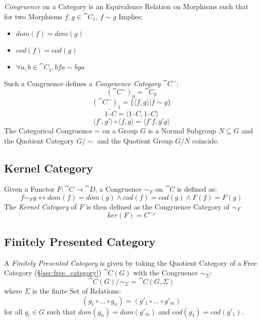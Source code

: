 \emph{Congruence} on a Category is an Equivalence Relation on
Morphisms such that for two Morphisms $f,g \in \cat{C_1}$, $f \sim
g$ Implies:
\begin{itemize}
  \item $dom(f) = dom(g)$
  \item $cod(f) = cod(g)$
  \item $\forall a,b \in \cat{C_1}, bfa \sim bga$
\end{itemize}
Such a Congruence defines a \emph{Congruence Category}
$\cat{C^{\sim}}$:
\[
  (\cat{C^{\sim}})_0 = \cat{C}_0
\]\[
  (\cat{C^{\sim}})_1 = \{\langle f,g \rangle | f \sim g\}
\]\[
  \tilde{1_\cat{C}} = \langle 1_\cat{C}, 1_\cat{C} \rangle
\]\[
  \langle f',g' \rangle \circ \langle f,g \rangle = \langle f'f,g'g \rangle
\]
The Categorical Congruence $\sim$ on a Group $G$ is a Normal Subgroup
$N \subseteq G$ and the Quotient Category $G/\sim$ and the Quotient
Group $G/N$ coincide. \cite{awodey06}



\subsection{Kernel Category}\label{sec:kernel_category}

Given a Functor $F : \cat{C} \rightarrow \cat{D}$, a Congruence
$\sim_F$ on $\cat{C}$ is defined as:
\[
  f \sim_F g \leftrightarrow dom(f) = dom(g) \wedge cod(f) = cod(g)
  \wedge F(f) = F(g)
\]
The \emph{Kernel Category} of $F$ is then defined as the Congruence
Category of $\sim_F$
\[
  ker(F) = C^{\sim_F}
\]



\subsection{Finitely Presented Category}
\label{sec:finitely_presented}

A \emph{Finitely Presented Category} is given by taking the Quotient
Category of a Free Category (\S\ref{sec:free_category})
$\cat{C}(G)$ with the Congruence $\sim_\Sigma$:
\[
  \cat{C}(G) / \sim_{\Sigma} = \cat{C}(G,\Sigma)
\]
where $\Sigma$ is the finite Set of Relations:
\[
  (g_1 \circ \ldots \circ g_n) = (g'_1 \circ \ldots \circ g'_m)
\]
for all $g_i \in G$ such that $dom(g_n) = dom(g'_m)$ and $cod(g_1) =
cod(g'_1)$.



